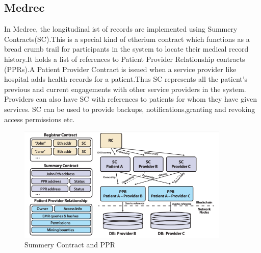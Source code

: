 \documentclass[12pt]{report}
\begin{document}
\subsection{Medrec \cite{2}}
In Medrec, the longitudinal ist of records are implemented using Summery Contracts(SC).This is a special kind of etherium contract which functions as a bread crumb trail for participants in the system to locate their medical record history.It holds a list of references to Patient Provider Relationship contracts (PPRs).A Patient Provider Contract is issued when a service provider like hospital adds health records for a patient.Thus SC represents all the patient's previous and current engagements with other service providers in the system. Providers can also have SC with references to patients for whom they have given services. SC can be used to provide backups, notifications,granting and revoking access permissions etc.
\begin{figure}[H]
\centering
\includegraphics[width=0.9\textwidth]{ppr.png}
\caption{Summery Contract and PPR}
\label{ppr}
\end{figure}
\end{document}
